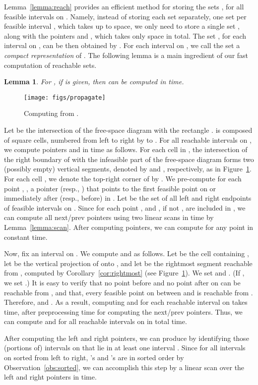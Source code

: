 \documentclass[12pt]{dalthesis}
\def\favoritefont{\bfseries \sffamily}
\def\QED{\ensuremath{{\Box}}}
\def\markatright#1{\leavevmode\unskip\nobreak\quad\hspace*{\fill}{#1}}
\newenvironment{proof}
	{\begin{trivlist}\item[\hskip\labelsep{\favoritefont Proof:}]}
	{\markatright{\QED}\end{trivlist}}
\newtheorem{lemma}[theorem]{Lemma}
\newcommand{\qed}{}
\newcommand{\fs}{free-space }
\begin{document}
Lemma~\ref{lemma:reach} provides an efficient method for storing the sets
, for all feasible intervals  on .
Namely, instead of storing each set  separately,
one set per feasible interval , 
which takes up to  space,
we only need to store a single set , 
along with the pointers  and ,
which takes only  space in total.
The set , for each interval  on ,
can be then obtained by .
For each interval  on ,
we call the set 
a \emph{compact representation} of .
The following lemma is a main ingredient of our fast computation of reachable sets.

\begin{lemma} \label{lemma:propagate}
	For , if  is given,
	then  can be computed in  time. 
\end{lemma}

	\begin{figure}[t]
		\centering
		\texttt{[image: figs/propagate]}
		\caption{Computing  from .}
		\label{fig:propagate}
	\end{figure}
	
\begin{proof}
	Let  be the intersection of the \fs diagram
	with the rectangle .
	 is composed of  square cells, numbered from left to right by  to .
	For all reachable intervals  on , 
	we compute pointers  and 
	in  time as follows.
	For each cell  in , the intersection of 
	the right boundary of  with the infeasible part of the \fs diagram
	forms two (possibly empty) vertical segments, denoted by
	 and , respectively, as in Figure~\ref{fig:propagate}. 
	For each cell , 
	we denote the top-right corner of  by .
	We pre-compute for each point , ,
	a pointer  (resp., ) 
	that points to the first feasible point on or immediately
	after (resp., before)  in .
	Let  be the set of all left and right endpoints of feasible intervals on .
	Since for each point ,  and , if not , are
	included in , we can compute all next/prev pointers using two linear scans
	in  time by Lemma~\ref{lemma:scan}.
	After computing  pointers,
	we can compute  for any point  in constant time.
	
	Now, fix an interval  on .
	We compute  and  as follows.
	Let  be the cell containing ,
	let  be the vertical projection of  onto ,
	and let  be the rightmost segment reachable from ,
	computed by Corollary~\ref{cor:rightmost}
	(see Figure~\ref{fig:propagate}).
	We set  and .
	(If , we set .)
	It is easy to verify that no point before  and no point after  on 
	can be reachable from , and that, every feasible point on  between 
	 and  is reachable from . 
	Therefore,  and .
	As a result, computing  and  
	for each reachable interval  on 
	takes  time,
	after  preprocessing time for computing the next/prev pointers.
	Thus, we can compute  and  for all reachable intervals  on 
	in  total time.

	After computing the left and right pointers, 
	we can produce 
	by identifying those (portions of) intervals on 
	that lie in at least one interval .
	Since for all intervals  on  sorted from left to right, 
	's and 's are in sorted order 
	by Observation~\ref{obs:sorted},
	we can accomplish this step by a linear scan over the 
	left and right pointers in  time.
	\qed
\end{proof}
\end{document}
